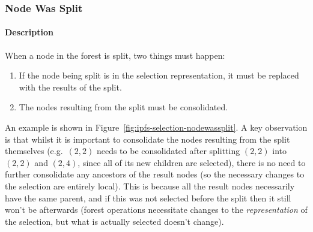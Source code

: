 
\afterpage{\clearpage}
\newpage

\subsubsection{Node Was Split}


\paragraph{Description}

When a node in the forest is split, two things must happen:

\begin{enumerate}

\item If the node being split is in the selection representation, it must be replaced with the results of the split.
\item The nodes resulting from the split must be consolidated.

\end{enumerate}

\noindent An example is shown in Figure~\ref{fig:ipfs-selection-nodewassplit}. A key observation is that whilst it is important to consolidate the nodes resulting from the split themselves (e.g.~$(2,2)$ needs to be consolidated after splitting $(2,2)$ into $(2,2)$ and $(2,4)$, since all of its new children are selected), there is no need to further consolidate any ancestors of the result nodes (so the necessary changes to the selection are entirely local). This is because all the result nodes necessarily have the same parent, and if this was not selected before the split then it still won't be afterwards (forest operations necessitate changes to the \emph{representation} of the selection, but what is actually selected doesn't change).

